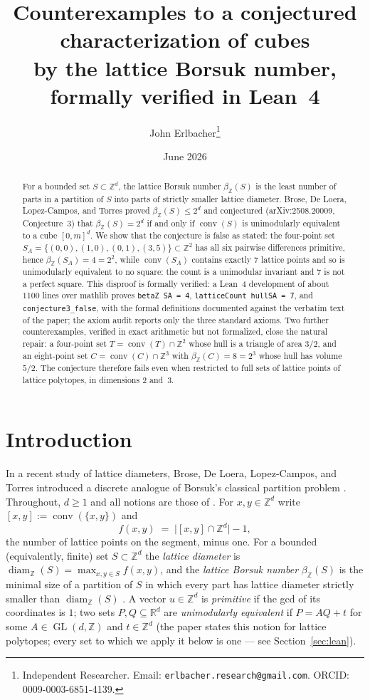 \documentclass[11pt]{article}
\title{Counterexamples to a conjectured characterization of cubes\\
by the lattice Borsuk number, formally verified in Lean~4}
\author{John Erlbacher\thanks{Independent Researcher. Email: \texttt{erlbacher.research@gmail.com}. ORCID: 0009-0003-6851-4139.}}
\date{June 2026}
\theoremstyle{remark}
\newcommand{\Z}{\mathbb{Z}}
\newcommand{\R}{\mathbb{R}}
\newcommand{\conv}{\operatorname{conv}}
\newcommand{\diamZ}{\operatorname{diam}_{\Z}}
\newcommand{\betaZ}{\beta_{\Z}}
\newcommand{\GL}{\operatorname{GL}}
\begin{document}
\maketitle

\begin{abstract}
For a bounded set $S \subset \Z^d$, the lattice Borsuk number $\betaZ(S)$ is
the least number of parts in a partition of $S$ into parts of strictly
smaller lattice diameter. Brose, De Loera, Lopez-Campos, and Torres proved
$\betaZ(S) \le 2^d$ and conjectured (arXiv:2508.20009, Conjecture~3) that
$\betaZ(S) = 2^d$ if and only if $\conv(S)$ is unimodularly equivalent to a
cube $[0,m]^d$. We show that the conjecture is false as stated: the
four-point set $S_A = \{(0,0),(1,0),(0,1),(3,5)\} \subset \Z^2$ has all six
pairwise differences primitive, hence $\betaZ(S_A) = 4 = 2^2$, while
$\conv(S_A)$ contains exactly $7$ lattice points and so is unimodularly
equivalent to no square: the count is a unimodular invariant and $7$ is not a
perfect square. This disproof is formally verified: a Lean~4 development of
about $1100$ lines over mathlib proves \texttt{betaZ SA = 4},
\texttt{latticeCount hullSA = 7}, and \texttt{conjecture3\_false}, with the
formal definitions documented against the verbatim text of the paper; the
axiom audit reports only the three standard axioms. Two further
counterexamples, verified in exact arithmetic but not formalized, close the
natural repair: a four-point set $T = \conv(T) \cap \Z^2$ whose hull is a
triangle of area $3/2$, and an eight-point set $C = \conv(C) \cap \Z^3$ with
$\betaZ(C) = 8 = 2^3$ whose hull has volume $5/2$. The conjecture therefore
fails even when restricted to full sets of lattice points of lattice
polytopes, in dimensions $2$ and~$3$.
\end{abstract}

\section{Introduction}\label{sec:intro}

In a recent study of lattice diameters, Brose, De Loera, Lopez-Campos, and
Torres \cite{BDLT2025} introduced a discrete analogue of Borsuk's classical
partition problem \cite{Borsuk1933,KahnKalai1993}. Throughout, $d \ge 1$ and
all notions are those of \cite{BDLT2025}. For $x, y \in \Z^d$ write
$[x,y] := \conv(\{x,y\})$ and
\[
f(x,y) \;=\; \bigl|[x,y] \cap \Z^d\bigr| - 1 ,
\]
the number of lattice points on the segment, minus one. For a bounded
(equivalently, finite) set $S \subset \Z^d$ the \emph{lattice diameter} is
$\diamZ(S) = \max_{x,y \in S} f(x,y)$, and the \emph{lattice Borsuk number}
$\betaZ(S)$ is the minimal size of a partition of $S$ in which every part has
lattice diameter strictly smaller than $\diamZ(S)$ \cite[Definition~1.3 and
\S 4.2]{BDLT2025}. A vector $u \in \Z^d$ is \emph{primitive} if the gcd of
its coordinates is $1$; two sets $P, Q \subseteq \R^d$ are \emph{unimodularly
equivalent} if $P = AQ + t$ for some $A \in \GL(d,\Z)$ and $t \in \Z^d$ (the
paper states this notion for lattice polytopes; every set to which we apply
it below is one --- see Section~\ref{sec:lean}).
\end{document}
